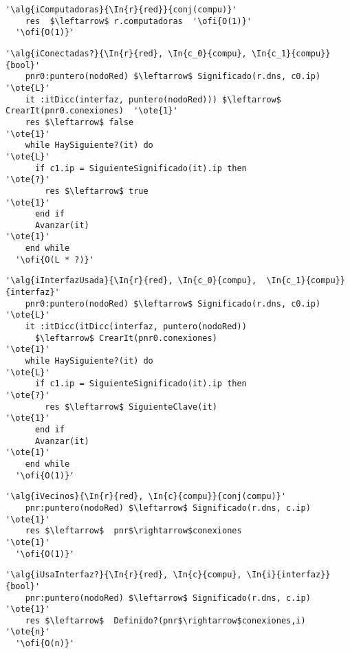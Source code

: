 \begin{lstlisting}[mathescape]
  '\alg{iComputadoras}{\In{r}{red}}{conj(compu)}'
    res  $\leftarrow$ r.computadoras  '\ofi{O(1)}'
  '\ofi{O(1)}'
\end{lstlisting}

\begin{lstlisting}[mathescape]
  '\alg{iConectadas?}{\In{r}{red}, \In{c_0}{compu}, \In{c_1}{compu}}{bool}'
    pnr0:puntero(nodoRed) $\leftarrow$ Significado(r.dns, c0.ip)                   '\ote{L}' 
    it :itDicc(interfaz, puntero(nodoRed))) $\leftarrow$ CrearIt(pnr0.conexiones)  '\ote{1}' 
    res $\leftarrow$ false                                                         '\ote{1}'
    while HaySiguiente?(it) do                                                     '\ote{L}'
      if c1.ip = SiguienteSignificado(it).ip then                                  '\ote{?}'
        res $\leftarrow$ true                                                      '\ote{1}'
      end if
      Avanzar(it)                                                                  '\ote{1}'
    end while
  '\ofi{O(L * ?)}'
\end{lstlisting}

\begin{lstlisting}[mathescape]
  '\alg{iInterfazUsada}{\In{r}{red}, \In{c_0}{compu},  \In{c_1}{compu}}{interfaz}'
    pnr0:puntero(nodoRed) $\leftarrow$ Significado(r.dns, c0.ip)                   '\ote{L}' 
    it :itDicc(itDicc(interfaz, puntero(nodoRed)) 
      $\leftarrow$ CrearIt(pnr0.conexiones)                                        '\ote{1}' 
    while HaySiguiente?(it) do                                                     '\ote{L}'
      if c1.ip = SiguienteSignificado(it).ip then                                  '\ote{?}'
        res $\leftarrow$ SiguienteClave(it)                                        '\ote{1}'
      end if
      Avanzar(it)                                                                  '\ote{1}'
    end while
  '\ofi{O(1)}'
\end{lstlisting}


\begin{lstlisting}[mathescape]
  '\alg{iVecinos}{\In{r}{red}, \In{c}{compu}}{conj(compu)}'
    pnr:puntero(nodoRed) $\leftarrow$ Significado(r.dns, c.ip)                     '\ote{1}'
    res $\leftarrow$  pnr$\rightarrow$conexiones                                   '\ote{1}'
  '\ofi{O(1)}'
\end{lstlisting}

\begin{lstlisting}[mathescape]
  '\alg{iUsaInterfaz?}{\In{r}{red}, \In{c}{compu}, \In{i}{interfaz}}{bool}'
    pnr:puntero(nodoRed) $\leftarrow$ Significado(r.dns, c.ip)                     '\ote{1}'
    res $\leftarrow$  Definido?(pnr$\rightarrow$conexiones,i)                      '\ote{n}'
  '\ofi{O(n)}'
\end{lstlisting}

